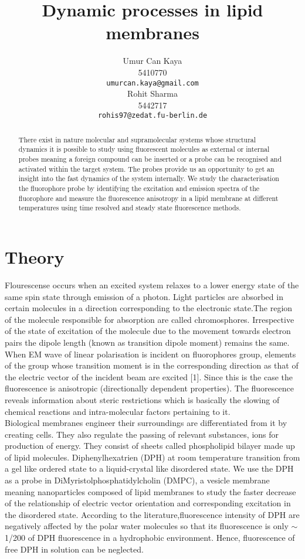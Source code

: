 \documentclass{article}
\title{Dynamic processes in lipid membranes}
\author{
Umur Can Kaya\\
5410770\\
\texttt{umurcan.kaya@gmail.com}\\
\And
Rohit Sharma\\
5442717\\
\texttt{rohis97@zedat.fu-berlin.de}\\
}
\begin{document}
\maketitle

\begin{abstract}
There exist in nature molecular and supramolecular systems whose structural dynamics it is possible to study using fluorescent molecules as external or internal probes meaning a foreign compound can be inserted or a probe can be recognised and activated within the target system. The probes provide us an opportunity to get an insight into the fast dynamics of the system internally. We study the characterisation  the  fluorophore  probe by identifying the  excitation and  emission  spectra  of  the fluorophore and measure the fluorescence anisotropy in a lipid membrane at different temperatures using time resolved and steady state fluorescence methods.
\end{abstract}

\section{Theory}
Flourescense occurs when an excited system relaxes to a lower energy state of the same spin state through emission of a photon. Light particles are absorbed in certain molecules in a direction corresponding to the electronic state.The region of the molecule responsible for absorption are called chromosphores. Irrespective of the state of excitation of the molecule due to the movement towards electron pairs the dipole length (known as transition dipole moment) remains the same. When EM wave of linear polarisation is incident on fluorophores group, elements of the group whose transition moment is in the corresponding direction as that of the electric vector of the incident beam are excited [1]. Since this is the case the  fluorescence is anisotropic (directionally dependent properties). The fluorescence reveals information about steric restrictions which is basically the slowing of chemical reactions and intra-molecular factors pertaining to it. \\

Biological membranes engineer their surroundings are differentiated from it by creating cells. They also regulate the passing of relevant substances, ions for production of energy. They consist of sheets called phospholipid bilayer made up of lipid molecules. Diphenylhexatrien (DPH) at room temperature transition from a gel like ordered state to a liquid-crystal like disordered state. We use the DPH as a probe in DiMyristolphosphatidylcholin (DMPC), a vesicle membrane meaning nanoparticles composed of lipid membranes to study the faster decrease of the relationship of electric vector orientation and corresponding excitation in the disordered state. According to the literature,fluorescence intensity of DPH are negatively affected by the polar water molecules so that its fluorescence is only  $\sim$  1/200  of  DPH fluorescence  in  a  hydrophobic  environment.  Hence,  fluorescence  of  free  DPH  in  solution can be neglected.
\end{document}
